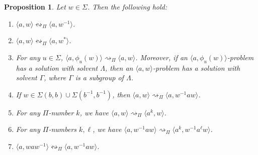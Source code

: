 \documentclass[11pt]{amsart}
\newtheorem{proposition}[theorem]{Proposition}
\theoremstyle{definition}
\theoremstyle{definition}
\numberwithin{equation}{section}
\begin{document}
\begin{proposition}\label{prop:awbasic} Let $w\in \Sigma$. Then the following hold:
\begin{enumerate}
\item[\rm (i)] $\langle a, w\rangle\leftrightsquigarrow_{\Pi}\langle a, w^{-1}\rangle$.
\item[\rm (ii)] $\langle a, w\rangle\leftrightsquigarrow_{\Pi}\langle a, w^*\rangle$.
\item[\rm (iii)] For any $u\in \Sigma$, $\langle a, \phi_u(w)\rangle\rightsquigarrow_{\Pi} \langle a, w\rangle$. Moreover, if an $\langle a, \phi_u(w)\rangle$-problem has a solution with solvent $\Lambda$, then an $\langle a, w\rangle$-problem has a solution with solvent $\Gamma$, where $\Gamma$ is a subgroup of $\Lambda$.
\item[\rm (iv)] If $w\in \Sigma(b, b)\cup \Sigma(b^{-1}, b^{-1})$, then $ \langle a, w\rangle \rightsquigarrow_{\Pi} \langle a, w^{-1}aw\rangle$.
\item[\rm (v)] For any $\Pi$-number $k$, we have $\langle a, w\rangle\rightsquigarrow_{\Pi}\langle a^k, w\rangle$.
\item[\rm (vi)] For any $\Pi$-numbers $k, \ell$, we have $\langle a,w^{-1}aw\rangle\rightsquigarrow_{\Pi}\langle a^k, w^{-1}a^\ell w\rangle$.
\item[\rm (vii)] $\langle a, waw^{-1}\rangle\leftrightsquigarrow_{\Pi}\langle a, w^{-1}aw\rangle$.
\end{enumerate}
\end{proposition}
\end{document}
